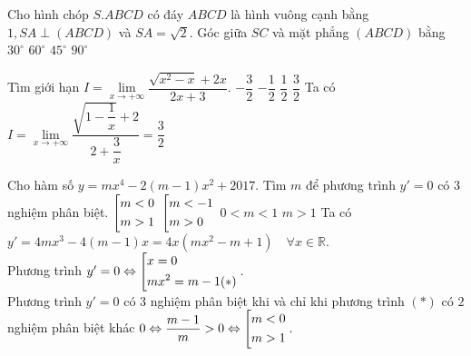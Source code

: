 \begin{ex}%
	Cho hình chóp $S.ABCD$ có đáy $ABCD$ là hình vuông cạnh bằng $1, SA \perp (ABCD)$ và $SA=\sqrt{2}$. Góc giữa $SC$ và mặt phẳng $(ABCD)$ bằng 
	\choice
	{$30^ \circ$}
	{ $60^ \circ$}
	{\True $ 45^\circ$}
	{$90^ \circ$}
\end{ex}
\begin{ex}%
	Tìm giới hạn $I= \lim\limits_{x \rightarrow + \infty} \dfrac{\sqrt{x^2-x}+2x}{2x+3}.$
	\choice
	{$-\dfrac{3}{2}$}
	{$-\dfrac{1}{2}$}
	{$\dfrac{1}{2}$}
	{\True$\dfrac{3}{2}$}
	\loigiai
	{Ta có $I= \lim\limits_{x \rightarrow + \infty} \dfrac{\sqrt{1-\dfrac{1}{x}}+2}{2+\dfrac{3}{x}} = \dfrac{3}{2}$
	}
\end{ex}
\begin{ex}%
	Cho hàm số $y=mx^4-2(m-1)x^2+2017$. Tìm $m$ để phương trình $y'=0$ có $3$ nghiệm phân biệt.
	\choice
	{\True $\left[\begin{aligned}&m<0\\&m>1\end{aligned}\right.$}
	{$\left[\begin{aligned}&m<-1\\&m>0\end{aligned}\right.$}
	{$0<m<1$}
	{$m>1$}
	\loigiai
	{ Ta có $y'=4mx^3-4(m-1)x = 4x(mx^2-m+1) \quad \forall x \in \mathbb{R}.$\\
		Phương trình $y'=0 \Leftrightarrow \left[\begin{aligned}&x=0\\&mx^2=m-1 (*)\end{aligned}\right..$\\
		Phương trình $y'=0$ có $3$ nghiệm phân biệt khi và chỉ khi phương trình $(*)$ có $2$ nghiệm phân biệt khác $0 \Leftrightarrow \dfrac{m-1}{m}>0 \Leftrightarrow \left[\begin{aligned}&m<0\\&m>1\end{aligned}\right..$
	}
\end{ex}
